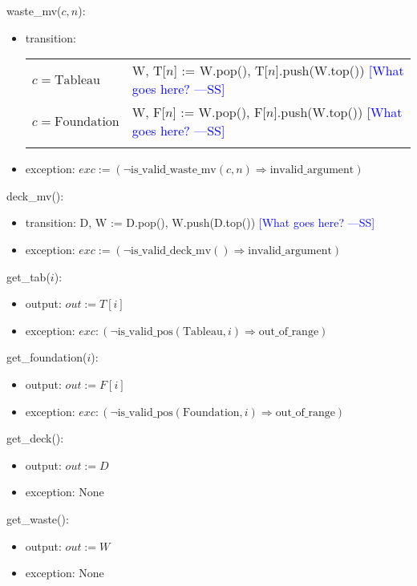 \documentclass[12pt]{article}
\newcommand{\authornote}[3]{\textcolor{#1}{[#3 ---#2]}}
\newcommand{\authornote}[3]{}
\newcommand{\wss}[1]{\authornote{blue}{SS}{#1}}
\begin{document}
\noindent waste\_mv($c, n$):
\begin{itemize}
\item transition:

\begin{tabular}{|p{3cm}|l|}
\hhline{|-|-|}
$c = \mbox{Tableau}$ & W, T[$n$] := W.pop(), T[$n$].push(W.top()) \wss{What goes here?}\\
\hhline{|-|-|}
$c = \mbox{Foundation}$ & W, F[$n$] := W.pop(), F[$n$].push(W.top()) \wss{What goes here?}\\
\hhline{|-|-|}
\end{tabular}

\item exception:
  $exc := (\neg \text{is\_valid\_waste\_mv}(c, n) \Rightarrow
  \text{invalid\_argument})$

\end{itemize}

\noindent deck\_mv():
\begin{itemize}
\item transition: D, W := D.pop(), W.push(D.top()) \wss{What goes here?}
\item exception:
  $exc := (\neg \text{is\_valid\_deck\_mv}() \Rightarrow \text{invalid\_argument})$
\end{itemize}

\noindent get\_tab($i$):
\begin{itemize}
\item output: $out := T[i]$
\item exception: $exc : (\neg \text{is\_valid\_pos}(\text{Tableau}, i) \Rightarrow \text{out\_of\_range})$
\end{itemize}

\noindent get\_foundation($i$):
\begin{itemize}
\item output: $out := F[i]$
\item exception: $exc : (\neg \text{is\_valid\_pos}(\text{Foundation}, i) \Rightarrow \text{out\_of\_range})$
\end{itemize}

\noindent get\_deck():
\begin{itemize}
\item output: $out := D$
\item exception: None
\end{itemize}

\noindent get\_waste():
\begin{itemize}
\item output: $out := W$
\item exception: None
\end{itemize}
\end{document}
